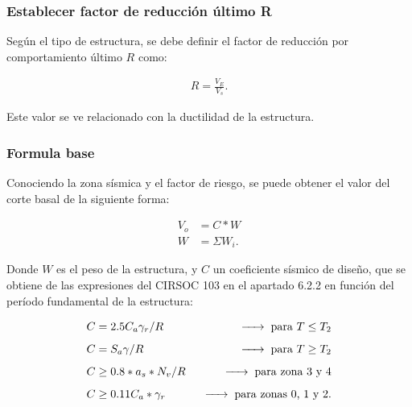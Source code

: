\documentclass[../main.tex]{subfiles}
\begin{document}
\subsubsection{Establecer factor de reducción último R}

Según el tipo de estructura, se debe definir el factor de reducción por comportamiento
último $R$ como:

 \begin{align*}
   R = \frac{V_E}{V_s}
.\end{align*}

Este valor se ve relacionado con la ductilidad de la estructura.

\subsubsection{Formula base}

Conociendo la zona sísmica y el factor de riesgo, se puede obtener el valor
del corte basal de la siguiente forma:

\begin{align*}
  V_o &= C*W \tag{Corte en base} \\[5pt]
  W &= \Sigma W_i
.\end{align*}

Donde $W$ es el peso de la estructura, y  $C$ un coeficiente sísmico de diseño,
que se obtiene de las expresiones del CIRSOC 103 en el apartado 6.2.2 en función
del período fundamental de la estructura:

\begin{align*}
  C &= 2.5 C_a \gamma_r / R \hspace{0.25cm} &\xrightarrow{\hspace*{0.5cm}} \hspace{0.1cm}\text{para } T\leq T_2 \\[5pt]
  C &= S_a \gamma / R \hspace{0.25cm} &\xrightarrow{\hspace*{0.5cm}} \hspace{0.1cm} \text{para } T \geq T_2 \\[5pt] 
  C &\geq 0.8 * a_s * N_v / R \hspace{0.25cm} &\xrightarrow{\hspace*{0.5cm}} \hspace{0.1cm} \text{para zona 3 y 4}   \\[5pt]
  C &\geq  0.11 C_a * \gamma_r \hspace{0.25cm} &\xrightarrow{\hspace*{0.5cm}} \hspace{0.1cm} \text{para zonas 0, 1 y 2} 
.\end{align*}
\end{document}
